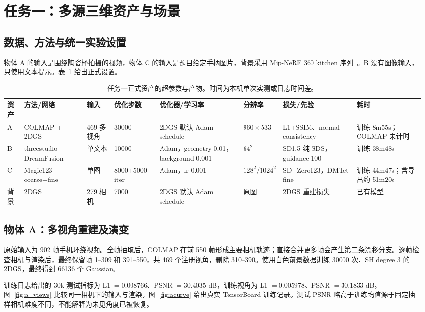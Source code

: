\documentclass[letterpaper,times,10pt,twocolumn]{article}
\begin{document}
\section{任务一：多源三维资产与场景}

\subsection{数据、方法与统一实验设置}

物体 A 的输入是围绕陶瓷杯拍摄的视频，物体 C 的输入是题目给定手柄图片，背景采用 Mip-NeRF 360 kitchen 序列~\cite{barron2022mipnerf360}。B 没有图像输入，只使用文本提示。表~\ref{tab:t1settings} 给出正式设置。

\begin{table}[t]
\centering
\caption{任务一正式资产的超参数与产物。时间为本机单次实测或日志时间差。}
\label{tab:t1settings}
\scriptsize
\begin{tabular}{p{1.3cm}p{2.1cm}p{1.7cm}p{1.7cm}p{2.1cm}p{1.4cm}p{1.7cm}p{1.8cm}}
\toprule
资产 & 方法/网络 & 输入 & 优化步数 & 优化器/学习率 & 分辨率 & 损失/先验 & 耗时 \\
\midrule
A & COLMAP + 2DGS & 469 多视角 & 30000 & 2DGS 默认 Adam schedule & $960\times533$ & L1+SSIM、normal consistency & 训练 8m55s；COLMAP 未计时 \\
B & threestudio DreamFusion & 单文本 & 10000 & Adam，geometry 0.01，background 0.001 & $64^2$ & SD1.5 纯 SDS，guidance 100 & 训练 38m48s \\
C & Magic123 coarse+fine & 单图 & 8000+5000 iter & Adam，lr 0.001 & $128^2/1024^2$ & SD+Zero123，DMTet fine & 训练 44m47s；含导出约 51m20s \\
背景 & 2DGS & 279 相机 & 7000 & 2DGS 默认 Adam schedule & 原图 & 2DGS 重建损失 & 已有模型 \\
\bottomrule
\end{tabular}
\end{table}

\subsection{物体 A：多视角重建及演变}

原始输入为 902 帧手机环绕视频。全帧抽取后，COLMAP 在前 550 帧形成主要相机轨迹；直接合并更多帧会产生第二条漂移分支。逐帧检查相机与渲染后，最终保留帧 1--309 和 391--550，共 469 个注册视角，删除 310--390。使用白色前景数据训练 30000 次、SH degree 3 的 2DGS，最终得到 66136 个 Gaussian。

训练日志给出的 30k 测试指标为 L1 $=0.008766$、PSNR $=30.4035$ dB，训练视角为 L1 $=0.005978$、PSNR $=30.1833$ dB。图~\ref{fig:a_views} 比较同一相机下的输入与渲染，图~\ref{fig:acurve} 给出真实 TensorBoard 训练记录。测试 PSNR 略高于训练均值源于固定抽样相机难度不同，不能解释为未见角度已被恢复。
\end{document}
